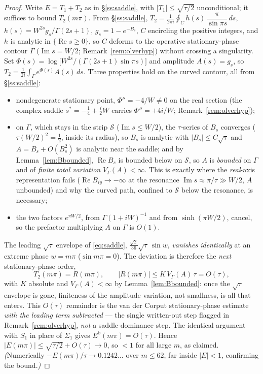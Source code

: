 \begin{proof}
Write $E=T_1+T_2$ as in \S\ref{ss:saddle}, with $|T_1|\le\sqrt{\tau/2}$ unconditional; it suffices to
bound $T_2(m\pi)$. From \S\ref{ss:saddle},
$T_2=\tfrac1{2\pi i}\oint_C h(s)\,\dfrac{\pi}{\sin\pi s}\,ds$, $h(s)=W^{2s}g_s/\Gamma(2s{+}1)$,
$g_s=1-e^{-B_s}$, $C$ encircling the positive integers, and $h$ is analytic in
$\{\operatorname{Re}s\ge0\}$, so $C$ deforms to the operative stationary-phase contour $\Gamma$
($\operatorname{Im}s=W/2$; Remark~\ref{rem:olverhyp}) without crossing a singularity. Set $\Phi(s)=\log\!\bigl[
W^{2s}/(\Gamma(2s{+}1)\sin\pi s)\bigr]$ and amplitude $A(s)=g_s$, so $T_2=\tfrac1{2i}\int_\Gamma
e^{\Phi(s)}A(s)\,ds$. Three properties hold on the curved contour, all from \S\ref{ss:saddle}:
\begin{itemize}[leftmargin=1.4em,itemsep=0.1em]
\item[\textup{(a)}] nondegenerate stationary point, $\Phi''=-4/W\ne0$ on the real section (the complex saddle $s^\ast=-\tfrac14+\tfrac i2W$ carries $\Phi''=+4i/W$; Remark~\ref{rem:olverhyp});
\item[\textup{(b)}] on $\Gamma$, which stays in the strip $\mathcal S$ ($\operatorname{Im}s\le W/2$), the
$\tau$-series of $B_s$ converges ($\tau(W/2)^2=\tfrac12$, inside its radius), so $B_s$ is analytic with
$|B_s|\le C\sqrt\tau$ and $A=B_s+O(B_s^2)$ is analytic near the saddle; and by
Lemma~\ref{lem:Bbounded}, $\operatorname{Re}B_s$ is bounded below on $\mathcal S$, so $A$ is
\emph{bounded} on $\Gamma$ and of \emph{finite total variation} $V_\Gamma(A)<\infty$. This is exactly
where the \emph{real}-axis representation fails ($\operatorname{Re}B_{iy}\to-\infty$ at the resonance
$\operatorname{Im}s\approx\pi/\tau\gg W/2$, $A$ unbounded) and why the curved path, confined to
$\mathcal S$ below the resonance, is necessary;
\item[\textup{(c)}] the two factors $e^{\pi W/2}$, from $\Gamma(1{+}iW)^{-1}$ and from $\sinh(\pi W/2)$,
cancel, so the prefactor multiplying $A$ on $\Gamma$ is $O(1)$.
\end{itemize}
The leading $\sqrt\tau$ envelope of \eqref{eq:saddle}, $\tfrac{\sqrt2}{36}\sqrt\tau\,\sin w$, \emph{vanishes
identically} at an extreme phase $w=m\pi$ ($\sin m\pi=0$). The deviation is therefore the \emph{next}
stationary-phase order,
\[
   T_2(m\pi)=R(m\pi),\qquad |R(m\pi)|\le K\,V_\Gamma(A)\,\tau=O(\tau),
\]
with $K$ absolute and $V_\Gamma(A)<\infty$ by Lemma~\ref{lem:Bbounded}: once the $\sqrt\tau$ envelope is gone,
finiteness of the amplitude variation, not smallness, is all that enters. This $O(\tau)$ remainder is the van
der Corput stationary-phase estimate \emph{with the leading term subtracted} --- the single written-out step
flagged in Remark~\ref{rem:olverhyp}, \emph{not} a saddle-dominance step. The identical argument with $S_1$ in
place of $\Sigma_1$ gives $E^{\mathrm{b}}(m\pi)=O(\tau)$. Hence $|E(m\pi)|\le\sqrt{\tau/2}+O(\tau)\to0$, so
$<1$ for all large $m$, as claimed.
\emph{(}Numerically $-E(m\pi)/\tau\to0.1242\ldots$ over $m\le62$, far inside $|E|<1$, confirming the
bound.\emph{)}
\end{proof}

